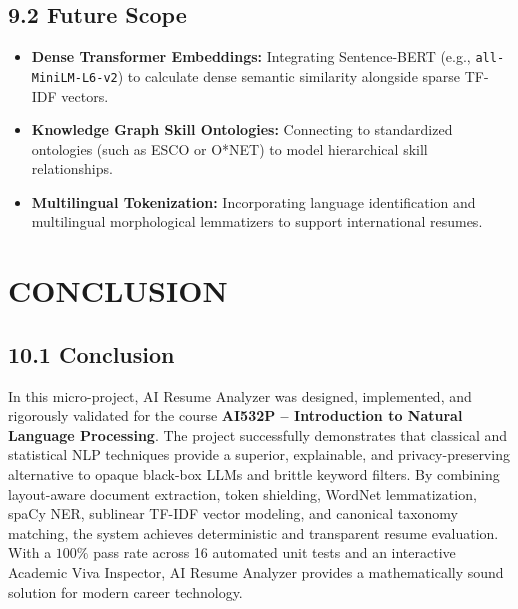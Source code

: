 \documentclass[11pt,a4paper]{article}
\begin{document}
\subsection{9.2 Future Scope}
\begin{itemize}[noitemsep]
    \item \textbf{Dense Transformer Embeddings:} Integrating Sentence-BERT (e.g., \texttt{all-MiniLM-L6-v2}) to calculate dense semantic similarity alongside sparse TF-IDF vectors.
    \item \textbf{Knowledge Graph Skill Ontologies:} Connecting to standardized ontologies (such as ESCO or O*NET) to model hierarchical skill relationships.
    \item \textbf{Multilingual Tokenization:} Incorporating language identification and multilingual morphological lemmatizers to support international resumes.
\end{itemize}

\newpage

\section{CONCLUSION}

\subsection{10.1 Conclusion}
In this micro-project, AI Resume Analyzer was designed, implemented, and rigorously validated for the course \textbf{AI532P -- Introduction to Natural Language Processing}. The project successfully demonstrates that classical and statistical NLP techniques provide a superior, explainable, and privacy-preserving alternative to opaque black-box LLMs and brittle keyword filters. By combining layout-aware document extraction, token shielding, WordNet lemmatization, spaCy NER, sublinear TF-IDF vector modeling, and canonical taxonomy matching, the system achieves deterministic and transparent resume evaluation. With a $100\%$ pass rate across 16 automated unit tests and an interactive Academic Viva Inspector, AI Resume Analyzer provides a mathematically sound solution for modern career technology.

\newpage

\end{document}
